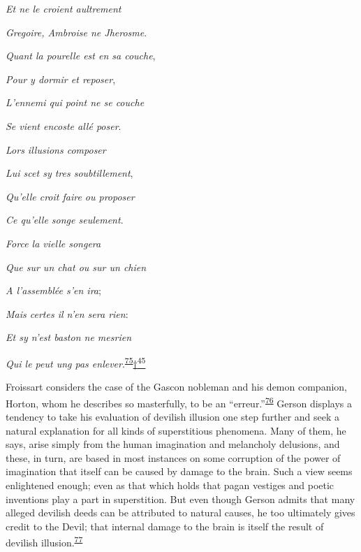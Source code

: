 \emph{Et ne le croient aultrement}

\emph{Gregoire, Ambroise ne Jherosme}.

\emph{Quant la pourelle est en sa couche},

\emph{Pour y dormir et reposer},

\emph{L'ennemi qui point ne se couche}

\emph{Se vient encoste allé poser}.

\emph{Lors illusions composer}

\emph{Lui scet sy tres soubtillement},

\emph{Qu'elle croit faire ou proposer}

\emph{Ce qu'elle songe seulement}.

\emph{Force la vielle songera}

\emph{Que sur un chat ou sur un chien}

\emph{A l'assemblée s'en ira};

\emph{Mais certes il n'en sera rien}:

\emph{Et sy n'est baston ne mesrien}

\emph{Qui le peut ung pas
enlever}.\textsuperscript{\protect\hypertarget{18_Chapter_Eleven__THE_FORMS_OF_THO.xhtmlux5cux23id_484}{\protect\hyperlink{23_NOTES.xhtmlux5cux23id_485}{75}}}\protect\hypertarget{18_Chapter_Eleven__THE_FORMS_OF_THO.xhtmlux5cux23id_2651}{\protect\hyperlink{23_NOTES.xhtmlux5cux23id_2652}{†\textsuperscript{45}}}

\protect\hypertarget{18_Chapter_Eleven__THE_FORMS_OF_THO.xhtmlux5cux23page_292}{}{}Froissart
considers the case of the Gascon nobleman and his demon companion,
Horton, whom he describes so masterfully, to be an
``erreur.''\textsuperscript{\protect\hypertarget{18_Chapter_Eleven__THE_FORMS_OF_THO.xhtmlux5cux23id_482}{\protect\hyperlink{23_NOTES.xhtmlux5cux23id_483}{76}}}
Gerson displays a tendency to take his evaluation of devilish illusion
one step further and seek a natural explanation for all kinds of
superstitious phenomena. Many of them, he says, arise simply from the
human imagination and melancholy delusions, and these, in turn, are
based in most instances on some corruption of the power of imagination
that itself can be caused by damage to the brain. Such a view seems
enlightened enough; even as that which holds that pagan vestiges and
poetic inventions play a part in superstition. But even though Gerson
admits that many alleged devilish deeds can be attributed to natural
causes, he too ultimately gives credit to the Devil; that internal
damage to the brain is itself the result of devilish
illusion.\textsuperscript{\protect\hypertarget{18_Chapter_Eleven__THE_FORMS_OF_THO.xhtmlux5cux23id_480}{\protect\hyperlink{23_NOTES.xhtmlux5cux23id_481}{77}}}

